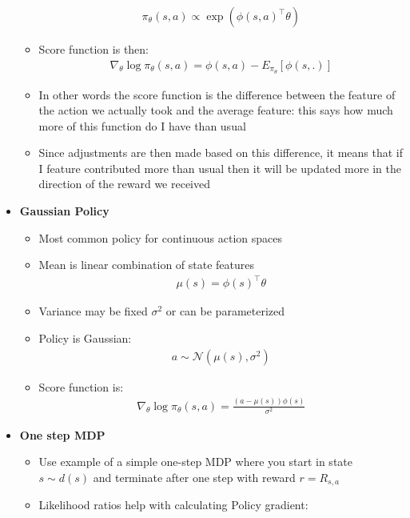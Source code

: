 \documentclass[12pt]{article}
\begin{document}
\begin{itemize}
\begin{itemize}
    \begin{gather*}
      \pi_\theta(s,a) \propto \exp(\phi(s,a)^\top\theta)
    \end{gather*}
    \item Score function is then:
    \begin{gather*}
      \nabla_\theta \log \pi_\theta(s, a) = \phi(s, a) - E_{\pi_\theta} [\phi(s, .)]
    \end{gather*}
    \item In other words the score function is the difference between the 
    feature of the action we actually took and the average feature: this says how much
    more of this function do I have than usual
    \item Since adjustments are then made based on this difference, it means that if I feature
    contributed more than usual then it will be updated more in the direction of the reward we received
  \end{itemize}
  \item \textbf{Gaussian Policy}
  \begin{itemize}
    \item Most common policy for continuous action spaces
    \item Mean is linear combination of state features
    \begin{gather*}
      \mu(s) = \phi(s)^\top\theta
    \end{gather*}
    \item Variance may be fixed $\sigma^2$ or can be parameterized
    \item Policy is Gaussian:
    \begin{gather*}
      a \sim \mathcal{N}(\mu(s), \sigma^2)
    \end{gather*}
    \item Score function is:
    \begin{gather*}
      \nabla_\theta \log \pi_\theta(s, a) = \frac{(a - \mu(s))\phi(s)}{\sigma^2}
    \end{gather*}
  \end{itemize}
  \item \textbf{One step MDP}
  \begin{itemize}
    \item Use example of a simple one-step MDP where you start in state $s \sim d(s)$ and terminate
    after one step with reward $r = R_{s,a}$
    \item Likelihood ratios help with calculating Policy gradient:
    \begin{gather*}

\end{gather*}
\end{itemize}
\end{itemize}
\end{document}
